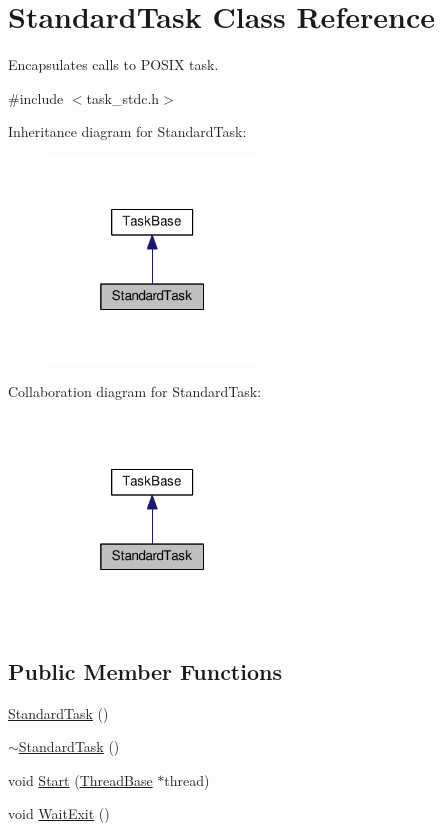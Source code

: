 \hypertarget{classStandardTask}{}\section{Standard\+Task Class Reference}
\label{classStandardTask}


Encapsulates calls to P\+O\+S\+IX task.  




{\ttfamily \#include $<$task\+\_\+stdc.\+h$>$}



Inheritance diagram for Standard\+Task\+:\nopagebreak
\begin{figure}[H]
\begin{center}
\leavevmode
\includegraphics[width=157pt]{classStandardTask__inherit__graph}
\end{center}
\end{figure}


Collaboration diagram for Standard\+Task\+:\nopagebreak
\begin{figure}[H]
\begin{center}
\leavevmode
\includegraphics[width=157pt]{classStandardTask__coll__graph}
\end{center}
\end{figure}
\subsection*{Public Member Functions}
\begin{DoxyCompactItemize}
\item 
\hyperlink{classStandardTask_ad4afb5b0dff5e65fd25a0f01e4152281}{Standard\+Task} ()
\item 
\hyperlink{classStandardTask_a21d94f9838aba597e3b03dfbdf7b4cf5}{$\sim$\+Standard\+Task} ()
\item 
void \hyperlink{classStandardTask_ab454fb19347e79aaaa85151255b630a4}{Start} (\hyperlink{classThreadBase}{Thread\+Base} $\ast$thread)
\item 
void \hyperlink{classStandardTask_a34a72e3871d0322b3078af9a1340b1cf}{Wait\+Exit} ()
\end{DoxyCompactItemize}



